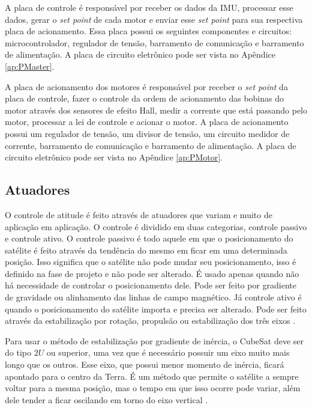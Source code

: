 \documentclass[
	12pt,				%
	openany,			%
	twoside,			%
	a4paper,			%
	english,			%
	french,				%
	spanish,			%
	brazil,				%
	oldfontcommands
	]{abntex2}
\begin{document}

A placa de controle é responsável por receber os dados da IMU, processar esse dados, gerar o \textit{set point} de cada motor e enviar esse \textit{set point} para sua respectiva placa de acionamento. Essa placa possui os seguintes componentes e circuitos: microcontrolador, regulador de tensão, barramento de comunicação e barramento de alimentação. A placa de circuito eletrônico pode ser vista no Apêndice \ref{ap:PMaster}. 


A placa de acionamento dos motores é responsável por receber o \textit{set point} da placa de controle, fazer o controle da ordem de acionamento das bobinas do motor através dos sensores de efeito Hall, medir a corrente que está passando pelo motor, processar a lei de controle e acionar o motor. A placa de acionamento possui um regulador de tensão, um divisor de tensão, um circuito medidor de corrente, barramento de comunicação e barramento de alimentação.  A placa de circuito eletrônico pode ser vista no Apêndice \ref{ap:PMotor}.

\subsection{Atuadores}

O controle de atitude é feito através de atuadores que variam e muito de aplicação em aplicação. O controle é dividido em duas categorias, controle passivo e controle ativo. O controle passivo é todo aquele em que o posicionamento do satélite é feito através da tendência do mesmo em ficar em uma determinada posição. Isso significa que o satélite não pode mudar seu posicionamento, isso é definido na fase de projeto e não pode ser alterado. É usado apenas quando não há necessidade de controlar o posicionamento dele. Pode ser feito por gradiente de gravidade ou alinhamento das linhas de campo magnético. Já controle ativo é quando o posicionamento do satélite importa e precisa ser alterado. Pode ser feito através da estabilização por rotação, propulsão ou estabilização dos três eixos \cite{FrancLav}.

Para usar o método de estabilização por gradiente de inércia, o CubeSat deve ser do tipo $2U$ ou superior, uma vez que é necessário possuir um eixo muito mais longo que os outros. Esse eixo, que possui menor momento de inércia, ficará apontado para o centro da Terra. É um método que permite o satélite a sempre voltar para a mesma posição, mas o tempo em que isso ocorre pode variar, além dele tender a ficar oscilando em torno do eixo vertical \cite{FrancLav}.
\end{document}
